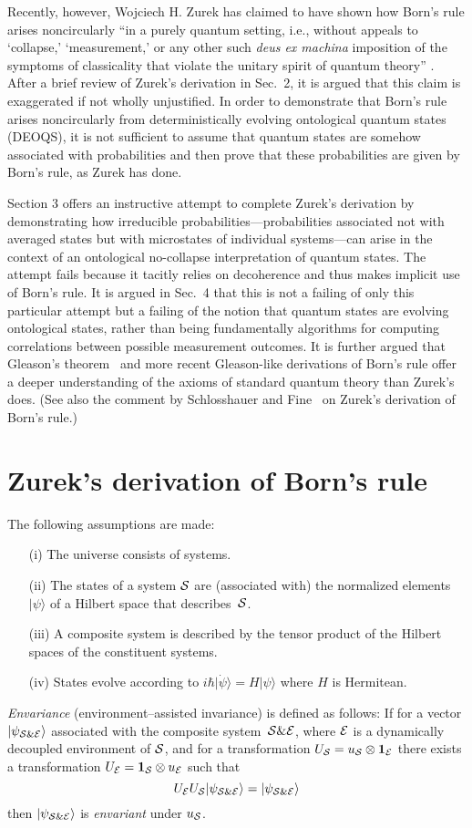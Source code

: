 \documentclass[12pt]{article}
\newcommand{\ket}[1]{\vert#1\rangle}
\newcommand{\be}{\begin{equation}}
\newcommand{\ee}{\end{equation}}
\newcommand{\cS}{{\cal S}}
\newcommand{\E}{{\cal E}}
\begin{document}
Recently, however, Wojciech H. Zurek has claimed to have shown how Born's rule 
arises noncircularly ``in a purely quantum setting, i.e., without appeals to 
`collapse,' `measurement,' or any other such {\it deus ex machina\/} imposition 
of the symptoms of classicality that violate the unitary spirit of quantum theory'' 
\cite{ZurekRMP,ZurekEnv,ZurekDarwin}. After a brief review of Zurek's 
derivation in Sec.~2, it is argued that this claim is exaggerated if not wholly 
unjustified. In order to demonstrate that Born's rule arises noncircularly from 
deterministically evolving ontological quantum states (DEOQS), it is not sufficient 
to assume that quantum states are somehow associated with probabilities and 
then prove that these probabilities are given by Born's rule, as Zurek has done.

Section 3 offers an instructive attempt to complete Zurek's derivation by 
demonstrating how irreducible probabilities---probabilities associated not with 
averaged states but with microstates of individual systems---can arise in the 
context of an ontological no-collapse interpretation of quantum states. The 
attempt fails because it tacitly relies on decoherence and thus makes implicit use 
of Born's rule. It is argued in Sec.~4 that this is not a failing of only this particular 
attempt but a failing of the notion that quantum states are evolving ontological 
states, rather than being fundamentally algorithms for computing correlations 
between possible measurement outcomes. It is further argued that Gleason's 
theorem~\cite{Gleason} and more recent Gleason-like derivations of Born's rule 
\cite{Fuchs,Busch,Cavesetal} offer a deeper understanding of the axioms of 
standard quantum theory than Zurek's does. (See also the comment by 
Schlosshauer and Fine~\cite{SchlossFine} on Zurek's derivation of Born's rule.)

\section{\large Zurek's derivation of Born's rule}
The following assumptions are made:
\begin{enumerate}
\item[(i)] The universe consists of systems.
\item[(ii)] The states of a system $\cS$ are (associated with) the normalized 
elements $\ket\psi$ of a Hilbert space that describes~$\cS$.
\item[(iii)] A composite system is described by the tensor product of the Hilbert 
spaces of the constituent systems.
\item[(iv)] States evolve according to $i\hbar\ket{\dot \psi}=H\ket\psi$ 
where $H$ is Hermitean.
\end{enumerate}
{\it Envariance\/} (environment--assisted invariance) is defined as follows: If 
for a vector $\ket{\psi_{\cS\&\E}}$ associated with the composite 
system~$\cS\&\E$, where $\cal E$ is a dynamically decoupled environment of 
$\cS$, and for a transformation $U_\cS = u_\cS \otimes {\bf 1}_\E$ there 
exists a transformation $U_\E = {\bf 1}_\cS \otimes u_\E$ such that
\be
U_\E U_\cS\ket{\psi_{\cS\&\E}} = \ket{\psi_{\cS\&\E}}
\ee
then $\ket{\psi_{\cS\&\E}}$ is {\it envariant\/} under $u_\cS$.
\end{document}
